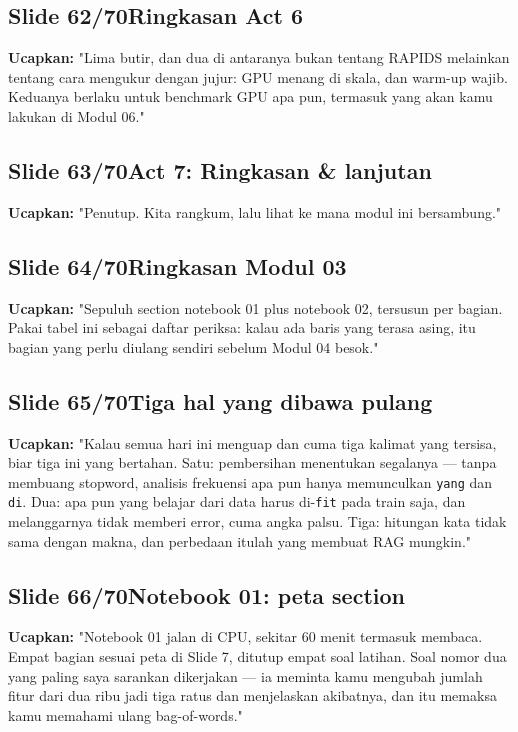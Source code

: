 \documentclass[11pt]{article}
\renewcommand{\framebox}[1]{\colorbox{acc!15}{\textcolor{acc}{\textbf{#1}}}}
\begin{document}
\subsection*{\framebox{Slide 62/70}\quad Ringkasan Act 6}
\textbf{Ucapkan:} "Lima butir, dan dua di antaranya bukan tentang RAPIDS melainkan tentang cara mengukur dengan jujur: GPU menang di skala, dan warm-up wajib. Keduanya berlaku untuk benchmark GPU apa pun, termasuk yang akan kamu lakukan di Modul 06."\\[2pt]

\subsection*{\framebox{Slide 63/70}\quad Act 7: Ringkasan \& lanjutan}
\textbf{Ucapkan:} "Penutup. Kita rangkum, lalu lihat ke mana modul ini bersambung."\\[2pt]

\subsection*{\framebox{Slide 64/70}\quad Ringkasan Modul 03}
\textbf{Ucapkan:} "Sepuluh section notebook 01 plus notebook 02, tersusun per bagian. Pakai tabel ini sebagai daftar periksa: kalau ada baris yang terasa asing, itu bagian yang perlu diulang sendiri sebelum Modul 04 besok."\\[2pt]

\subsection*{\framebox{Slide 65/70}\quad Tiga hal yang dibawa pulang}
\textbf{Ucapkan:} "Kalau semua hari ini menguap dan cuma tiga kalimat yang tersisa, biar tiga ini yang bertahan. Satu: pembersihan menentukan segalanya — tanpa membuang stopword, analisis frekuensi apa pun hanya memunculkan \texttt{yang} dan \texttt{di}. Dua: apa pun yang belajar dari data harus di-\texttt{fit} pada train saja, dan melanggarnya tidak memberi error, cuma angka palsu. Tiga: hitungan kata tidak sama dengan makna, dan perbedaan itulah yang membuat RAG mungkin."\\[2pt]

\subsection*{\framebox{Slide 66/70}\quad Notebook 01: peta section}
\textbf{Ucapkan:} "Notebook 01 jalan di CPU, sekitar 60 menit termasuk membaca. Empat bagian sesuai peta di Slide 7, ditutup empat soal latihan. Soal nomor dua yang paling saya sarankan dikerjakan — ia meminta kamu mengubah jumlah fitur dari dua ribu jadi tiga ratus dan menjelaskan akibatnya, dan itu memaksa kamu memahami ulang bag-of-words."\\[2pt]
\end{document}
